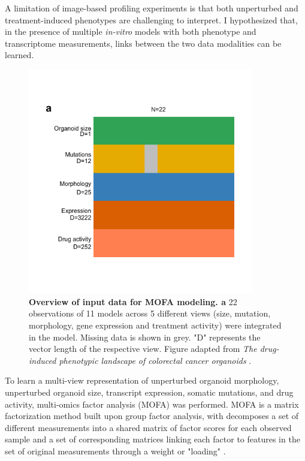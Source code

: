 \begin{flushleft}
A limitation of image-based profiling experiments is that both unperturbed and treatment-induced phenotypes are challenging to interpret. I hypothesized that, in the presence of multiple \textit{in-vitro} models with both phenotype and transcriptome measurements, links between the two data modalities can be learned. 

\begin{figure}[!h]
\centering
\includegraphics[width=280pt,
                height=\textheight,
                keepaspectratio]{figures/promise/pdf/fig_4_2.pdf}
\caption[Overview of input data for MOFA modeling]{\textbf{Overview of input data for MOFA modeling. a} 22 observations of 11 models across 5 different views (size, mutation, morphology, gene expression and treatment activity) were integrated in the model. Missing data is shown in grey. "D" represents the vector length of the respective view. Figure adapted from \textit{The drug-induced phenotypic landscape of colorectal cancer organoids} \parencite{betgeDruginducedPhenotypicLandscape2022}.}
\label{fig_242}
\end{figure}

To learn a multi-view representation of unperturbed organoid morphology, unperturbed organoid size, transcript expression, somatic mutations, and drug activity, multi-omics factor analysis (MOFA) was performed. MOFA is a matrix factorization method built upon group factor analysis, with decomposes a set of different measurements into a shared matrix of factor scores for each observed sample and a set of corresponding matrices linking each factor to features in the set of original measurements through a weight or "loading" \parencite{argelaguetMultiOmicsFactorAnalysis2018b}. 


\end{flushleft}
